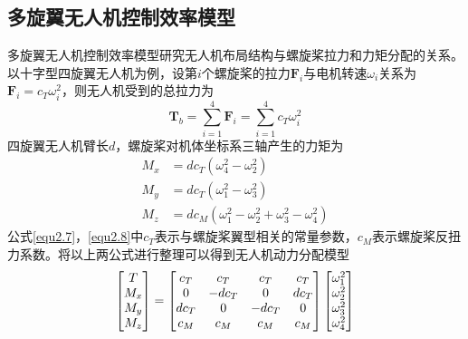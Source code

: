 \subsection{多旋翼无人机控制效率模型}
多旋翼无人机控制效率模型研究无人机布局结构与螺旋桨拉力和力矩分配的关系\upcite{[2.4]}。以十字型四旋翼无人机为例，设第$i$个螺旋桨的拉力$\boldsymbol{F}_i$与电机转速$\omega_i$关系为$\boldsymbol{F}_i = c_T \omega_i^2$，则无人机受到的总拉力为
\begin{equation}
\label{equ2.7}
\boldsymbol{T}_b = \sum\limits_{i=1}^4 \boldsymbol{F}_i =  \sum\limits_{i=1}^4 c_T \omega_i^2
\end{equation}
四旋翼无人机臂长$d$，螺旋桨对机体坐标系三轴产生的力矩为
\begin{equation}
\label{equ2.8}
\begin{aligned}
M_x &= d c_T \left( \omega_4^2 - \omega_2^2\right)
\\
M_y &= d c_T \left( \omega_1^2 - \omega_3^2\right)
\\
M_z &= d c_M \left( \omega_1^2 - \omega_2^2 + \omega_3^2 - \omega_4^2\right)
\end{aligned}
\end{equation}
公式\eqref{equ2.7}，\eqref{equ2.8}中$c_T $表示与螺旋桨翼型相关的常量参数，$c_M$表示螺旋桨反扭力系数。将以上两公式进行整理可以得到无人机动力分配模型
\begin{equation}
\label{equ2.9}
\begin{bmatrix}
T \cr M_x \cr M_y \cr M_z \cr 
\end{bmatrix}
=
\begin{bmatrix}
c_T & c_T & c_T & c_T  \cr
0 & -d c_T & 0 & d c_T \cr
d c_T & 0 & -d c_T & 0 \cr
c_M & c_M & c_M & c_M  \cr
\end{bmatrix}
\begin{bmatrix}
\omega_1^2 \cr \omega_2^2 \cr \omega_3^2 \cr \omega_4^2 \cr
\end{bmatrix}
\end{equation}


